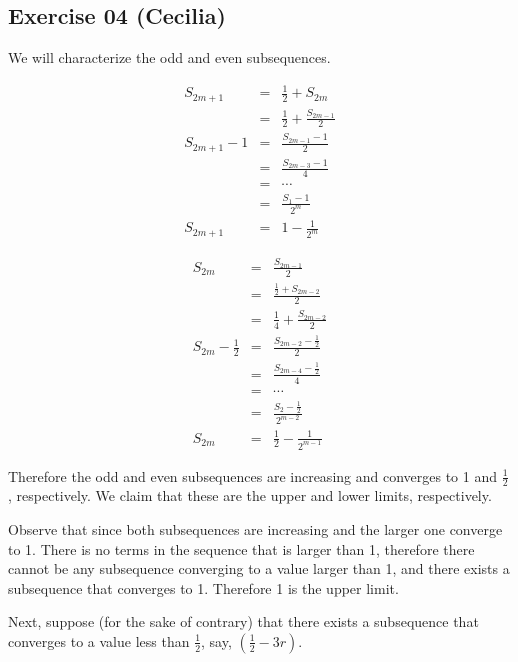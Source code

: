 \subsection*{Exercise 04 (Cecilia)}
We will characterize the odd and even subsequences.

\begin{eqnarray*}
      S_{2m + 1} &=& \frac{1}{2} + S_{2m}             \\
                 &=& \frac{1}{2} + \frac{S_{2m-1}}{2} \\
  S_{2m + 1} - 1 &=& \frac{S_{2m-1} - 1}{2}           \\
                 &=& \frac{S_{2m-3} - 1}{4}           \\
                 &=& \cdots                           \\
                 &=& \frac{S_1 - 1}{2^m}              \\
      S_{2m + 1} &=& 1 - \frac{1}{2^m}
\end{eqnarray*}

\begin{eqnarray*}
                S_{2m} &=& \frac{S_{2m-1}}{2}                \\
                       &=& \frac{\frac{1}{2} + S_{2m-2}}{2}  \\
                       &=& \frac{1}{4} + \frac{S_{2m-2}}{2}  \\
  S_{2m} - \frac{1}{2} &=& \frac{S_{2m-2} - \frac{1}{2}}{2}  \\
                       &=& \frac{S_{2m-4} - \frac{1}{2}}{4}  \\
                       &=& \cdots                            \\
                       &=& \frac{S_2 - \frac{1}{2}}{2^{m-2}} \\
                S_{2m} &=& \frac{1}{2} - \frac{1}{2^{m-1}}
\end{eqnarray*}

Therefore the odd and even subsequences are increasing and converges to 1 and $\frac{1}{2}$, respectively. We claim that these are the upper and lower limits, respectively.

Observe that since both subsequences are increasing and the larger one converge to 1. There is no terms in the sequence that is larger than 1, therefore there cannot be any subsequence converging to a value larger than 1, and there exists a subsequence that converges to 1. Therefore 1 is the upper limit.

Next, suppose (for the sake of contrary) that there exists a subsequence that converges to a value less than $\frac{1}{2}$, say, $ \left(\frac{1}{2} - 3r\right) $.

